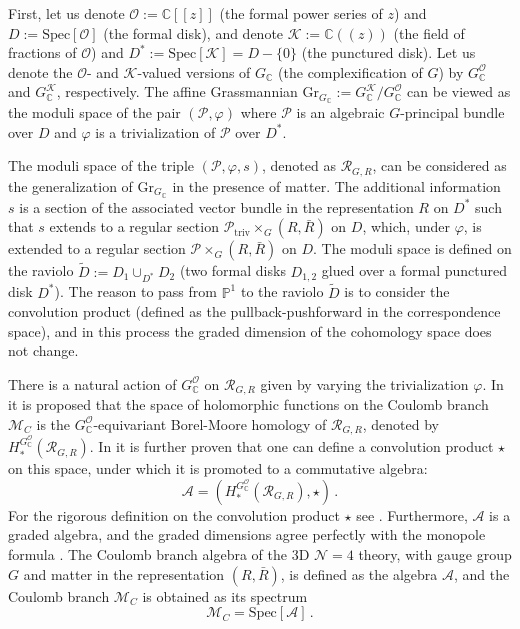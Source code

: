 \documentclass[12pt,a4paper]{article}
\renewcommand{\(}{\left(}
\renewcommand{\)}{\right)}
\renewcommand{\(}{\left(}
\renewcommand{\)}{\right)}
\begin{document}
First, let us denote $\mathcal{O}:=\mathbb{C}[[z]]$ (the formal power series of $z$) and  $D:=\text{Spec}[\mathcal{O}]$ (the formal disk), and  denote $\mathcal{K}:=\mathbb{C}((z))$  (the field of fractions of $\mathcal{O}$)  and $D^*:=\text{Spec}[\mathcal{K}]=D-\{0\}$ (the punctured disk). 
Let us denote the $\mathcal{O}$- and $\mathcal{K}$-valued versions of $G_{\mathbb{C}}$ (the complexification of $G$) by $G_{\mathbb{C}}^{\mathcal{O}}$ and $G_{\mathbb{C}}^{\mathcal{K}}$, respectively. 
The affine Grassmannian $\text{Gr}_{G_{\mathbb{C}}}:=G_{\mathbb{C}}^{\mathcal{K}}/G_{\mathbb{C}}^{\mathcal{O}}$ can be viewed as the moduli space of the pair $(\mathscr{P}, \varphi)$ where $\mathscr{P}$ is an algebraic $G$-principal bundle over $D$ and $\varphi$ is a trivialization of $\mathscr{P}$ over $D^{*}$.


The moduli space of the triple $(\mathscr{P},\varphi,s)$, denoted as $\mathcal{R}_{G,R}$, can be considered as the generalization of $\text{Gr}_{G_{\mathbb{C}}}$ in the presence of matter.
The additional information $s$ is a section of the associated vector bundle in the representation $R$ on $D^{*}$ such that $s$ extends to a regular section $\mathscr{P}_{\textrm{triv}}\times_G(R,\bar{R})$ on $D$, which, under $\varphi$, is extended to a regular section $\mathscr{P}\times_G(R,\bar{R})$ on $D$. 
The moduli space is defined on the raviolo $\tilde{D}:=D_1\cup_{D^*}D_2$ (two formal disks $D_{1,2}$ glued over a formal punctured disk $D^*$). 
The reason to  pass from $\mathbb{P}^1$ to the raviolo $\tilde{D}$ is to consider the convolution product (defined as the pullback-pushforward in the correspondence space), and in this process the graded dimension of the cohomology space does not change.




\medskip

There is a natural action of $G^{\mathcal{O}}_{\mathbb{C}}$ on $\mathcal{R}_{G,R}$  given by varying the trivialization $\varphi$. 
In \cite{Nakajima:2015txa} it is proposed that the space of holomorphic functions on the Coulomb branch $\mathcal{M}_C$ is the $G^{\mathcal{O}}_{\mathbb{C}}$-equivariant Borel-Moore homology of $\mathcal{R}_{G,R}$, denoted by $H^{G_{\mathbb{C}}^{\mathcal{O}}}_*(\mathcal{R}_{G,R})$. 
In \cite{Braverman:2016wma} it is further proven that one can define a convolution product
$\star$ on this space, under which it is promoted to a commutative algebra:
\begin{equation}
	\mathcal{A}=(H^{G_{\mathbb{C}}^{\mathcal{O}}}_*(\mathcal{R}_{G,R}),\star)\,.
\end{equation}
For the rigorous definition on the convolution product $\star$ see  \cite[Sec.~3]{Braverman:2016wma}. 
Furthermore, $\mathcal{A}$ is a graded algebra, and the graded dimensions agree perfectly with the monopole formula \cite{Nakajima:2015txa}. 
The Coulomb branch algebra of the 3D $\mathcal{N}=4$ theory, with gauge group $G$ and matter in the representation $(R,\bar{R})$, is defined as the algebra $\mathcal{A}$, and the Coulomb branch $\mathcal{M}_C$ is obtained as its spectrum
\begin{equation}
	\mathcal{M}_C=\text{Spec}[\mathcal{A}]\,.
\end{equation}
\end{document}
